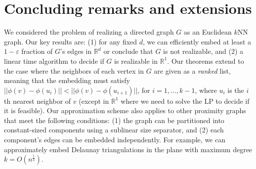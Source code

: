 \section{Concluding remarks and extensions}

We considered the problem of realizing a directed graph $G$ as an Euclidean $k$NN graph. Our key results are: (1) for any fixed $d$, we can efficiently embed at least a $1 - \varepsilon$ fraction of $G$'s edges in $\mathbb{R}^d$ or conclude that $G$ is not realizable, and (2) a linear time algorithm to decide if $G$ is realizable in $\mathbb{R}^1$.
Our theorems extend to the case where the neighbors of each vertex in $G$ are given as a \emph{ranked} list, meaning that the embedding must satisfy $||\phi(v) - \phi(u_i)|| < || \phi(v) - \phi(u_{i+1})||$, for $i=1, \ldots, k-1$, where $u_i$ is the $i$th nearest neighbor of $v$ (except in $\mathbb{R}^1$ where we need to solve the LP to decide if it is feasible).
Our approximation scheme also applies to other proximity graphs that meet the following conditions: (1) the graph can be partitioned into constant-sized components using a sublinear size separator, and (2) each component's edges can be embedded independently. For example, we can approximately embed Delaunay triangulations in the plane with maximum degree $k = O(n^\frac{1}{3})$. 

